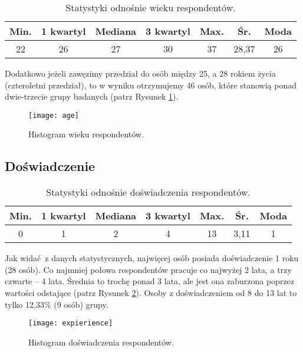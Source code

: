 \begin{table}[h!]
\begin{center}
\begin{tabular}{c c c c c c c}
Min. & 1 kwartyl & Mediana & 3 kwartyl & Max. & Śr. & Moda \\ \hline
22 & 26 & 27 & 30 & 37 & 28,37 & 26 \\
\end{tabular}
\end{center}
\caption{Statystyki odnośnie wieku respondentów.}
\label{tab:age-stats}
\end{table}

Dodatkowo jeżeli zawęzimy przedział do osób między 25, a 28 rokiem życia (czteroletni przedział), to w wyniku otrzymujemy 46 osób, które stanowią ponad dwie-trzecie grupy badanych (patrz Rysunek \ref{fig:age}).

\begin{figure}[h]
\begin{center}
\texttt{[image: age]}
\end{center}
\caption{Histogram wieku respondentów.}
\label{fig:age}
\end{figure}

\subsection{Doświadczenie}
\label{sec:group-exp}

\begin{table}[h!]
\begin{center}
\begin{tabular}{c c c c c c c}
Min. & 1 kwartyl & Mediana & 3 kwartyl & Max. & Śr. & Moda \\ \hline
0 & 1 & 2 & 4 & 13 & 3,11 & 1 \\
\end{tabular}
\end{center}
\caption{Statystyki odnośnie doświadczenia respondentów.}
\label{tab:expierience-stats}
\end{table}

Jak widać z danych statystycznych, najwięcej osób posiada doświadczenie 1 roku (28 osób). Co najmniej połowa respondentów pracuje co najwyżej 2 lata, a trzy czwarte -- 4 lata. Średnia to trochę ponad 3 lata, ale jest ona zaburzona poprzez wartości odstające (patrz Rysunek \ref{fig:expierience}). Osoby z doświadczeniem od 8 do 13 lat to tylko 12,33\% (9 osób) grupy.

\begin{figure}[h]
\begin{center}
\texttt{[image: expierience]}
\end{center}
\caption{Histogram doświadczenia respondentów.}
\label{fig:expierience}
\end{figure}


